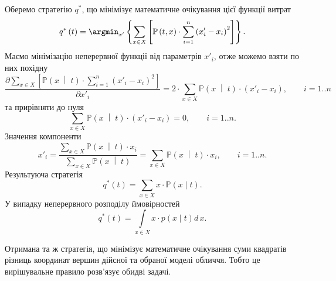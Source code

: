 Оберемо стратегію $q^*$,
що мінімізує математичне очікування цієї функції витрат
\begin{equation*}
  q^* \left( t \right)
  = \argmin_{x'} \left\{
    \sum\limits_{x \in X} \left[
        \mathbb{P} \left( t, x \right)
        \cdot \sum_{i = 1}^n \left( x'_i - x_i \right)^2
      \right]
    \right\}.
\end{equation*}
Маємо мінімізацію неперервної функції від параметрів $x'_i$,
отже можемо взяти по них похідну
\begin{equation*}
  \frac{\partial \sum\limits_{x \in X} \left[
      \mathbb{P} \left( x \;\middle|\;  t \right)
      \cdot \sum\limits_{i = 1}^n \left( x'_i - x_i \right)^2
  \right]}{\partial x'_i}
  = 2 \cdot \sum_{x \in X} \mathbb{P} \left( x \;\middle|\;  t \right)
    \cdot \left( x'_i - x_i \right), \qquad i = 1..n
\end{equation*}
та прирівняти до нуля
\begin{equation*}
  \sum_{x \in X} \mathbb{P} \left( x \;\middle|\;  t \right)
  \cdot \left( x'_i - x_i \right) = 0, \qquad i = 1..n.
\end{equation*}
Значення компоненти
\begin{equation*}
  x'_i = \frac{\sum\limits_{x \in X}
    \mathbb{P} \left( x \;\middle|\;  t \right) \cdot x_i}
    {\sum\limits_{x \in X}
      \mathbb{P} \left( x \;\middle|\;  t \right)}
  = \sum\limits_{x \in X}
    \mathbb{P} \left( x \;\middle|\;  t \right) \cdot x_i, \qquad i = 1..n.
\end{equation*}
Результуюча стратегія
\begin{equation*}
  q^*\left( t \right)
  = \sum_{x \in X} x \cdot \mathbb{P}\left( x \mid t \right).
\end{equation*}
У випадку неперервного розподілу ймовірностей
\begin{equation*}
  q^*\left( t \right)
  = \int\limits_{x \in X} x \cdot p\left( x \mid t \right) d\,x.
\end{equation*}

Отримана та ж стратегія,
що мінімізує математичне очікування суми квадратів різниць
координат вершин дійсної та обраної моделі обличчя.
Тобто це вирішувальне правило розв'язує обидві задачі.
